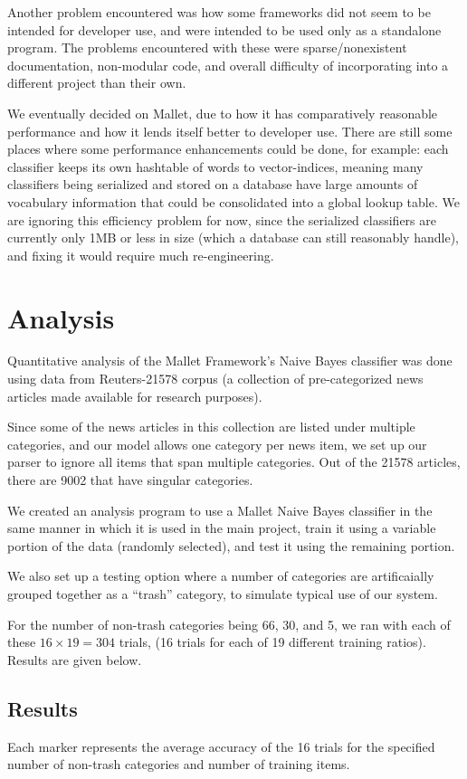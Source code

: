 \documentclass[letterpaper]{article}
\begin{document}
Another problem encountered was how some frameworks did not seem to be intended for developer use, and were intended to be used only as a standalone program. The problems encountered with these were sparse/nonexistent documentation, non-modular code, and overall difficulty of incorporating into a different project than their own.

We eventually decided on Mallet, due to how it has comparatively reasonable performance and how it lends itself better to developer use. There are still some places where some performance enhancements could be done, for example: each classifier keeps its own hashtable of words to vector-indices, meaning many classifiers being serialized and stored on a database have large amounts of vocabulary information that could be consolidated into a global lookup table. We are ignoring this efficiency problem for now, since the serialized classifiers are currently only 1MB or less in size (which a database can still reasonably handle), and fixing it would require much re-engineering.

\section{Analysis}
Quantitative analysis of the Mallet Framework's Naive Bayes classifier was done using data from Reuters-21578 corpus \cite{Reuters21578} (a collection of pre-categorized news articles made available for research purposes).

Since some of the news articles in this collection are listed under multiple categories, and our model allows one category per news item, we set up our parser to ignore all items that span multiple categories. Out of the 21578 articles, there are 9002 that have singular categories.

We created an analysis program to use a Mallet Naive Bayes classifier in the same manner in which it is used in the main project, train it using a variable portion of the data (randomly selected), and test it using the remaining portion.

We also set up a testing option where a number of categories are artificaially grouped together as a ``trash'' category, to simulate typical use of our system.

For the number of non-trash categories being 66, 30, and 5, we ran with each of these $16\times 19=304$ trials, (16 trials for each of 19 different training ratios). Results are given below.

\subsection{Results}
Each marker represents the average accuracy of the 16 trials for the specified number of non-trash categories and number of training items.
\end{document}
